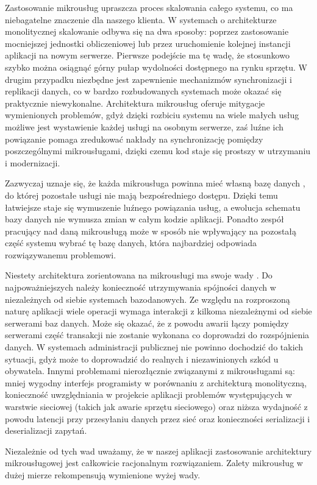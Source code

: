 \documentclass[licencjacka]{pracamgr}
\begin{document}
Zastosowanie mikrousług upraszcza proces skalowania całego systemu, co ma niebagatelne
znaczenie dla naszego klienta. W systemach o architekturze monolitycznej skalowanie
odbywa się na dwa sposoby: poprzez zastosowanie mocniejszej jednostki obliczeniowej
lub przez uruchomienie kolejnej instancji aplikacji na nowym serwerze. Pierwsze
podejście ma tę wadę, że stosunkowo szybko można osiągnąć górny pułap wydolności
dostępnego na rynku sprzętu. W drugim przypadku niezbędne jest zapewnienie mechanizmów
synchronizacji i replikacji danych, co w bardzo rozbudowanych systemach może okazać się
praktycznie niewykonalne. Architektura mikrousług oferuje mitygacje wymienionych problemów,
gdyż dzięki rozbiciu systemu na wiele małych usług możliwe jest
wystawienie każdej usługi na osobnym serwerze, zaś luźne ich powiązanie pomaga
zredukować nakłady na synchronizację pomiędzy poszczególnymi mikrousługami, dzięki
czemu kod staje się prostszy w utrzymaniu i modernizacji.

Zazwyczaj uznaje się, że każda mikrousługa powinna mieć własną bazę danych \cite{nginx},
do której pozostałe usługi nie mają bezpośredniego dostępu. Dzięki temu łatwiejsze
staje się wymuszenie luźnego powiązania usług, a ewolucja schematu bazy danych nie
wymusza zmian w całym kodzie aplikacji. Ponadto zespół pracujący nad daną mikrousługą
może w sposób nie wpływający na pozostałą część systemu wybrać tę bazę danych, która
najbardziej odpowiada rozwiązywanemu problemowi.

Niestety architektura zorientowana na mikrousługi ma swoje wady \cite{hauer}.
Do najpoważniejszych należy konieczność utrzymywania spójności danych w niezależnych
od siebie systemach bazodanowych. Ze względu na rozproszoną naturę aplikacji
wiele operacji wymaga interakcji z kilkoma niezależnymi od siebie serwerami baz
danych. Może się okazać, że z powodu awarii łączy pomiędzy serwerami część
transakcji nie zostanie wykonana co doprowadzi do rozspójnienia danych. W systemach
administracji publicznej nie powinno dochodzić do takich sytuacji, gdyż może to
doprowadzić do realnych i niezawinionych szkód u obywatela. Innymi problemami
nierozłącznie związanymi z mikrousługami są: mniej wygodny interfejs programisty
w porównaniu z architekturą monolityczną, konieczność uwzględniania w projekcie
aplikacji problemów występujących w warstwie sieciowej (takich jak awarie sprzętu
sieciowego) oraz niższa wydajność z powodu latencji przy przesyłaniu danych przez
sieć oraz konieczności serializacji i deserializacji zapytań.

Niezależnie od tych wad uważamy, że w naszej aplikacji zastosowanie architektury
mikrousługowej jest całkowicie racjonalnym rozwiązaniem. Zalety mikrousług w dużej
mierze rekompensują wymienione wyżej wady.
\end{document}
